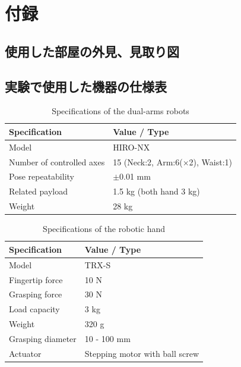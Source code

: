 \appendix 

\section{付録}
\label{appendix}
\subsection{使用した部屋の外見、見取り図}

\newpage

\subsection{実験で使用した機器の仕様表}

\begin{table}[ht]
\caption{Specifications of the dual-arms robots}    
\centering
  \begin{tabular}{ll} \hline
    Specification & Value / Type \\ \hline 
    Model & HIRO-NX  \\ 
    Number of controlled axes & 15 (Neck:2, Arm:6($\times$2), Waist:1)  \\
    Pose repeatability & $\pm$0.01 mm \\
    Related payload & 1.5 kg (both hand 3 kg) \\ 
    Weight & 28 kg   \\ \hline 
  \end{tabular}
  \label{tab:deformasion_1}
\end{table}

\begin{table}[ht]
\caption{Specifications of the robotic hand}    
\centering
  \begin{tabular}{ll} \hline
    Specification & Value / Type \\ \hline 
    Model & TRX-S  \\ 
    Fingertip force & 10 N  \\
    Grasping force & 30 N  \\  
    Load capacity & 3 kg \\ 
    Weight & 320 g   \\ 
    Grasping diameter & 10 - 100 mm  \\ 
    Actuator & Stepping motor with ball screw   \\ \hline 
  \end{tabular}
  \label{tab:deformasion_2}
\end{table}


